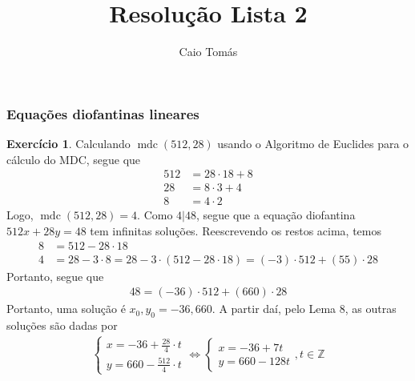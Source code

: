 \documentclass[a4paper,12pt]{article}
\title{Resolução Lista 2}
\date{}
\author{Caio Tomás}
\DeclareMathOperator{\mdc}{mdc}
\theoremstyle{definition}
\newtheorem{exercise}{Exercício}%
\begin{document}
	\maketitle
	\subsubsection*{Equações diofantinas lineares}
	\begin{exercise}
		Calculando $\mdc(512, 28)$ usando o Algoritmo de Euclides para o cálculo do MDC, segue que
		\begin{align*}
			512 &= 28\cdot 18 + 8 \\
			28 &= 8\cdot 3 + 4 \\
			8 &= 4\cdot 2
		\end{align*}
		Logo, $\mdc(512,28) = 4$. Como $4|48$, segue que a equação diofantina $512x + 28y = 48$ tem infinitas soluções. Reescrevendo os restos acima, temos
		\begin{align*}
		8 &= 512 - 28\cdot 18 \\
		4 &= 28 - 3\cdot 8 = 28 - 3\cdot( 512 - 28\cdot 18 ) = (-3)\cdot 512 + (55)\cdot 28
		\end{align*}
		Portanto, segue que
		\begin{align*}
		48 = (-36)\cdot 512 + (660)\cdot 28
		\end{align*}
		Portanto, uma solução é $x_0, y_0 = -36, 660$. A partir daí, pelo Lema 8, as outras soluções são dadas por
		\begin{align*}
		\begin{cases}
		x = -36 + \displaystyle{\frac{28}{4}}\cdot t \\
		y = 660 - \displaystyle{\frac{512}{4}}\cdot t
		\end{cases} \Leftrightarrow \begin{cases}
		x = -36 + 7t \\
		y = 660 - 128t
		\end{cases}, t\in\mathbb{Z}
		\end{align*}
	\end{exercise}
\end{document}
